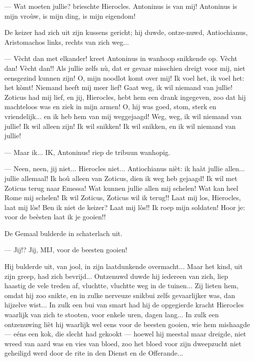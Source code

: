 \documentclass[a4paper, 12pt, oneside, dutch]{article}
\begin{document}
--- Wat moeten jullie? brieschte Hierocles. Antoninus is van mij! Antoninus is mijn vroùw, is mijn ding, is mijn eigendom!

De keizer had zich uit zijn kussens gericht; hij duwde, ontze-nuwd, Antiochianus, Aristomachos links, rechts van zich weg...

--- Vècht dan met elkander! kreet Antoninus in wanhoop snikkende op. Vècht dan! Vècht dan!! Als jullie zelfs nù, dat er gevaar misschien dreigt voor mij, niet eensgezind kunnen zijn! O, mijn noodlot komt over mij! Ik voel het, ik voel het: het kòmt! Niemand heeft mij meer lief! Gaat weg, ik wil niemand van jullie! Zoticus had mij lief, en jij, Hierocles, hebt hem een drank ingegeven, zoo dat hij machteloos was en ziek in mijn armen! O, hij was goed, stom, sterk en vriendelijk... en ik heb hem van mij weggejaagd! Weg, weg, ik wil niemand van jullie! Ik wil alleen zijn! Ik wil snikken! Ik wil snikken, en ik wil niemand van jullie!

--- Maar ik... IK, Antoninus! riep de tribuun wanhopig.

--- Neen, neen, jij niet... Hierocles niet... Antiochianus nièt: ik haàt jullie allen... jullie allemaal! Ik hoû alleen van Zoticus, dien ik weg heb gejaagd! Ik wil met Zoticus terug naar Emessa! Wat kunnen jullie allen mij schelen! Wat kan heel Rome mij schelen! Ik wil Zoticus, Zoticus wil ik terug!! Laat mij los, Hierocles, laat mij lòs! Ben ik niet de keizer? Laat mij lòs!! Ik roep mijn soldaten! Hoor je: voor de beèsten laat ik je gooien!!

De Gemaal bulderde in schaterlach uit.

--- Jij!? Jij, MIJ, voor de beesten gooien!

Hij bulderde uit, van jool, in zijn laatdunkende overmacht... Maar het kind, uit zijn greep, had zich bevrijd... Ontzenuwd duwde hij iedereen van zich, liep haastig de vele treden af, vluchtte, vluchtte weg in de tuinen... Zij lieten hem, omdat hij zoo snikte, en in zulke nerveuze snikbui zelfs gevaarlijker was, dan hijzelve wist... In zulk een bui van smart had hij de opgegierde kracht Hierocles waarlijk van zich te stooten, voor enkele uren, dagen lang... In zulk een ontzenuwing lièt hij waarlijk wel eens voor de beesten gooien, wie hem mishaagde --- eéns een kok, die slecht had gekookt --- hoewel hij meestal maar dreigde, niet wreed van aard was en vies van bloed, zoo het bloed voor zijn dweepzucht niet geheiligd werd door de rite in den Dienst en de Offerande...
\end{document}
